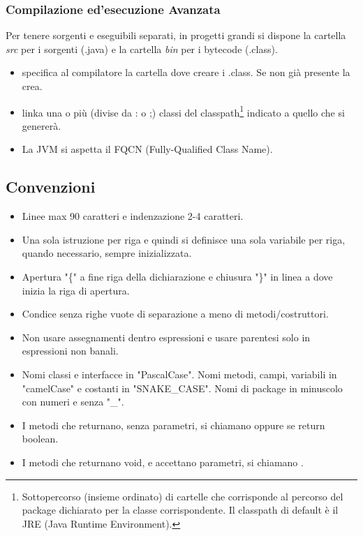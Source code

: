 \subsubsection{Compilazione ed'esecuzione Avanzata}
Per tenere sorgenti e eseguibili separati, in progetti grandi si dispone la cartella \textit{src} per i sorgenti (.java) e la cartella \textit{bin} per i bytecode (.class).



\begin{itemize}
	\item {} specifica al compilatore la cartella dove creare i .class. Se non già presente la crea.
	\item {} linka una o più (divise da : o ;) classi del classpath\footnote{Sottopercorso (insieme ordinato) di cartelle che corrisponde al percorso del package dichiarato per la classe corrispondente. Il classpath di default è il JRE (Java Runtime Environment).} indicato a quello che si genererà.
	\item La JVM si aspetta il FQCN (Fully-Qualified Class Name).
\end{itemize}

\subsection{Convenzioni}
\begin{itemize}
	\item Linee max 90 caratteri e indenzazione 2-4 caratteri.
	\item Una sola istruzione per riga e quindi si definisce una sola variabile per riga, quando necessario, sempre inizializzata.
	\item Apertura "\{" a fine riga della dichiarazione e chiusura "\}" in linea a dove inizia la riga di apertura.
	\item Condice senza righe vuote di separazione a meno di metodi/costruttori.
	\item Non usare assegnamenti dentro espressioni e usare parentesi solo in espressioni non banali.
	\item Nomi classi e interfacce in "PascalCase". Nomi metodi, campi, variabili in "camelCase" e costanti in "SNAKE\_CASE". Nomi di package in minuscolo con numeri e senza "\_".
	\bigskip
	\item I metodi che returnano, senza parametri, si chiamano  oppure  se return boolean.
	\item I metodi che returnano void, e accettano parametri, si chiamano .
\end{itemize}


